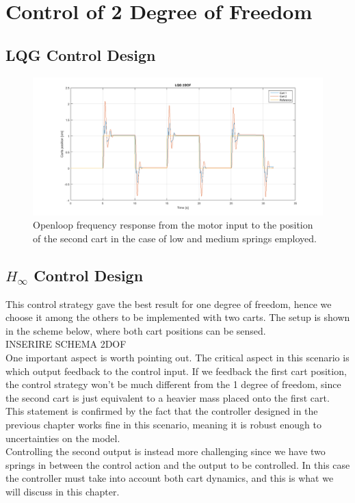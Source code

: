 {\let\clearpage\relax \chapter{Control of 2 Degree of Freedom}}
\section{LQG Control Design}

\begin{figure}[h]
\centering
\includegraphics[width=0.5\linewidth]{img/lqg_2dof.png}
\caption{Openloop frequency response from the motor input to the position of the second cart in the case of low and medium springs employed.}
\label{fig:lqg2dof}
\end{figure}
\section{$H_\infty$ Control Design}
This control strategy gave the best result for one degree of freedom, hence we choose it among the others to be implemented with two carts. The setup is shown in the scheme below, where both cart positions can be sensed.\\

INSERIRE SCHEMA 2DOF\\

One important aspect is worth pointing out. The critical aspect in this scenario is which output feedback to the control input. If we feedback the first cart position, the control strategy won't be much different from the 1 degree of freedom, since the second cart is just equivalent to a heavier mass placed onto the first cart. This statement is confirmed by the fact that the controller designed in the previous chapter works fine in this scenario, meaning it is robust enough to uncertainties on the model.\\

Controlling the second output is instead more challenging since we have two springs in between the control action and the output to be controlled. In this case the controller must take into account both cart dynamics, and this is what we will discuss in this chapter.\\

